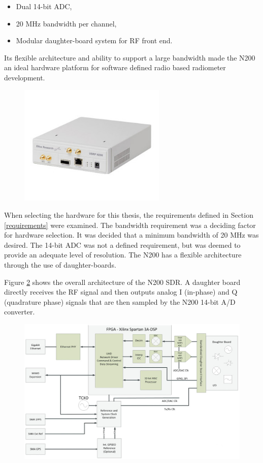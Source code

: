 \begin{itemize}
\item Dual 14-bit ADC,
\item 20 MHz bandwidth per channel,
\item Modular daughter-board system for RF front end.
\end{itemize}

Its flexible architecture and ability to support a large bandwidth made the N200 an ideal hardware platform for software defined radio based radiometer development.

{\begin{figure}[h!tb] 
\centering
\includegraphics[width=7cm]{Images/n200}
\label{N200}
\end{figure}
}

When selecting the hardware for this thesis, the requirements defined in Section \ref{requirements} were examined.  The bandwidth requirement was a deciding factor for hardware selection.  It was decided that a minimum bandwidth of 20 MHz was desired.  The 14-bit ADC was not a defined requirement, but was deemed to provide an adequate level of resolution.  The N200 has a flexible architecture through the use of daughter-boards.  

Figure \ref{N200_block} shows the overall architecture of the N200 SDR.  A daughter board directly receives the RF signal and then outputs analog I (in-phase) and Q (quadrature phase) signals that are then sampled by the N200 14-bit  A/D converter.

{\begin{figure}[h!tb] 
\centering
\includegraphics[width=14cm]{Images/n200_block_edited}
\label{N200_block}
\end{figure}
}

